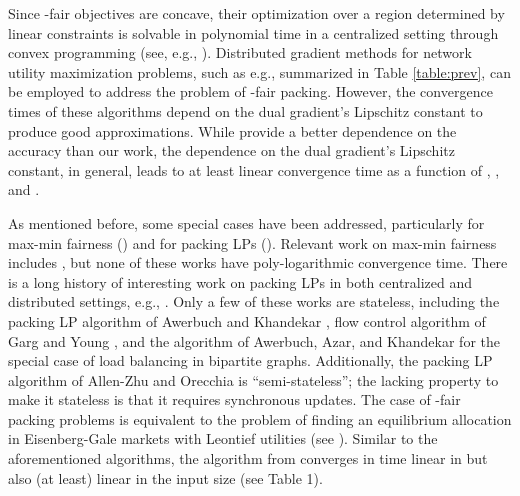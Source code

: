 \documentclass[11pt]{article}
\begin{document}
Since -fair objectives are concave, their optimization over a region determined by linear constraints is solvable in polynomial time in a centralized setting through convex programming (see, e.g., \cite{boyd2009convex, nesterov2004introductory}). Distributed gradient methods for network utility maximization problems, such as e.g., \cite{Beck2014Gradient, mosk2010fully} summarized in Table \ref{table:prev}, can be employed to address the problem of -fair packing. However, the convergence times of these algorithms depend on the dual gradient's Lipschitz constant to produce good approximations. While \cite{Beck2014Gradient, mosk2010fully} provide a better dependence on the accuracy  than our work, the dependence on the dual gradient's Lipschitz constant, in general, leads to at least linear convergence time as a function of , , and . 

As mentioned before, some special cases have been addressed, particularly for max-min fairness () and for  packing LPs (). Relevant work on max-min fairness includes \cite{Bertsekas:1987:DN:12517, jaffe1981bottleneck, kumar2000fairness, kleinberg1999fairness, megiddo1974optimal, marasevic2014max,charny1995congestion}, but none of these works have poly-logarithmic convergence time.  
There is a long history of interesting work on packing LPs in both centralized and distributed settings, e.g., \cite{c-allen2015nearly, c-plotkin1995fast, c-koufogiannakis2007beating, c-garg2007faster, AwerbuchKhandekar2009, d-luby1993parallel, d-bartal1997global, dc-young2001sequential, d-kuhn2006price, d-allen2014using, garg2002line}.  Only a few of these works are stateless, including 
 the packing LP algorithm of Awerbuch and Khandekar \cite{AwerbuchKhandekar2009}, flow control algorithm of Garg and Young \cite{garg2002line}, and the algorithm of Awerbuch, Azar, and Khandekar \cite{awerbuch2008fast} for the special case of load balancing in bipartite graphs. Additionally, the packing LP algorithm of Allen-Zhu and Orecchia \cite{d-allen2014using} is ``semi-stateless''; the lacking property to make it stateless is that it requires synchronous updates. 
The  case of -fair packing problems is equivalent to the problem of finding an equilibrium allocation in Eisenberg-Gale markets with Leontief utilities (see \cite{cheung2013tatonnement}). Similar to the aforementioned algorithms, the algorithm from \cite{cheung2013tatonnement} converges in time linear in  but also (at least) linear in the input size (see Table 1).
\end{document}
